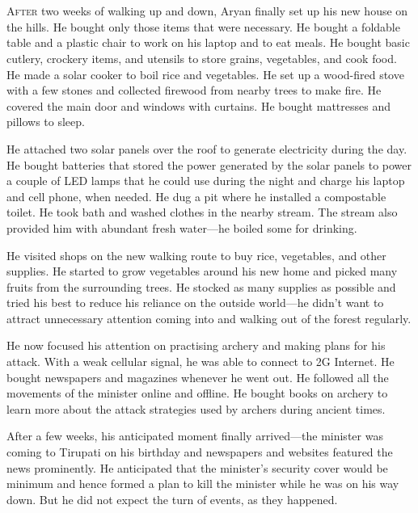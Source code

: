 \chapter{}

\lettrine{A}{fter} two weeks of walking up and down, Aryan finally set up his new house on
the hills. He bought only those items that were necessary. He bought a foldable
table and a plastic chair to work on his laptop and to eat meals. He bought
basic cutlery, crockery items, and utensils to store grains, vegetables, and
cook food. He made a solar cooker to boil rice and vegetables. He set up a
wood-fired stove with a few stones and collected firewood from nearby trees to
make fire. He covered the main door and windows with curtains. He bought
mattresses and pillows to sleep.

He attached two solar panels over the roof to generate electricity during the
day. He bought batteries that stored the power generated by the solar panels to
power a couple of LED lamps that he could use during the night and charge his
laptop and cell phone, when needed. He dug a pit where he installed a
compostable toilet. He took bath and washed clothes in the nearby stream. The
stream also provided him with abundant fresh water—he boiled some for drinking.

He visited shops on the new walking route to buy rice, vegetables, and other
supplies. He started to grow vegetables around his new home and picked many fruits
from the surrounding trees. He stocked as many supplies as possible and tried his
best to reduce his reliance on the outside world—he didn't want to attract
unnecessary attention coming into and walking out of the forest regularly.

He now focused his attention on practising archery and making plans for his
attack. With a weak cellular signal, he was able to connect to 2G Internet. He
bought newspapers and magazines whenever he went out. He followed all the
movements of the minister online and offline. He bought books on archery to
learn more about the attack strategies used by archers during ancient times.

After a few weeks, his anticipated moment finally arrived—the minister was
coming to Tirupati on his birthday and newspapers and websites featured the news
prominently. He anticipated that the minister's security cover would be minimum
and hence formed a plan to kill the minister while he was on his way down. But
he did not expect the turn of events, as they happened.